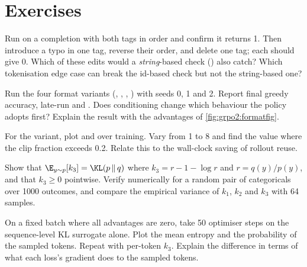 \section{Exercises}\label{sec:grpo2:exercises}

\begin{exercise}
Run  on a completion with both tags in order and confirm it returns 1.
Then introduce a typo in one tag, reverse their order, and delete one tag; each should give
0. Which of these edits would a \emph{string}-based check () also catch?
Which tokenisation edge case can break the id-based check but not the string-based one?
\end{exercise}

\begin{exercise}
Run the four format variants (, , ,
) with seeds 0, 1 and 2. Report final greedy accuracy, late-run  and . Does
conditioning change which behaviour the policy adopts first? Explain the result with the
advantages of \cref{fig:grpo2:formatfig}.
\end{exercise}

\begin{exercise}
For the  variant, plot  and  over
training. Vary  from 1 to 8 and find the value where the clip fraction
exceeds 0.2. Relate this to the wall-clock saving of rollout reuse.
\end{exercise}

\begin{exercise}[unbiasedness of $k_3$]
Show that $\E_{y\sim p}[k_3]=\KL(p\,\|\,q)$ where $k_3=r-1-\log r$ and $r=q(y)/p(y)$, and
that $k_3\ge0$ pointwise. Verify numerically for a random pair of categoricals over 1000
outcomes, and compare the empirical variance of $k_1$, $k_2$ and $k_3$ with 64 samples.
\end{exercise}

\begin{exercise}
On a fixed batch where all advantages are zero, take 50 optimiser steps on the
sequence-level KL surrogate alone. Plot the mean entropy and the probability of the sampled
tokens. Repeat with per-token $k_3$. Explain the difference in terms of what each loss's
gradient does to the sampled tokens.
\end{exercise}

